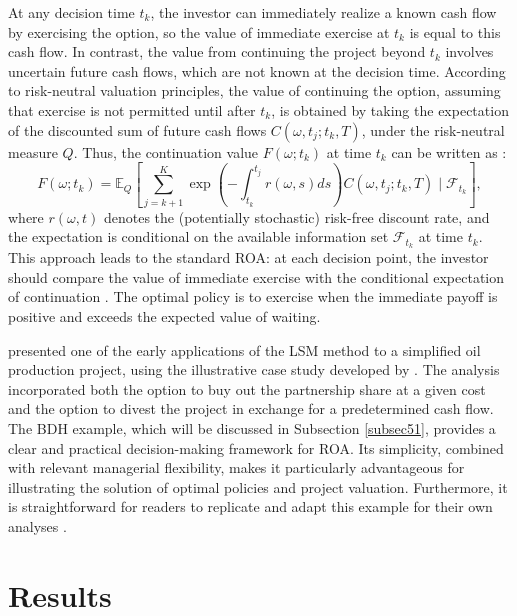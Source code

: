 \documentclass[pdflatex,sn-basic]{sn-jnl}%
\theoremstyle{thmstyleone}%
\theoremstyle{thmstyletwo}%
\theoremstyle{thmstylethree}%
\begin{document}
At any decision time $t_k$, the investor can immediately realize a known cash flow by exercising the option, so the value of immediate exercise at $t_k$ is equal to this cash flow. In contrast, the value from continuing the project beyond $t_k$ involves uncertain future cash flows, which are not known at the decision time. According to risk-neutral valuation principles, the value of continuing the option, assuming that exercise is not permitted until after $t_k$, is obtained by taking the expectation of the discounted sum of future cash flows $C(\omega, t_j; t_k, T)$, under the risk-neutral measure $Q$. Thus, the continuation value $F(\omega; t_k)$ at time $t_k$ can be written as \citep{ref14}:
\begin{equation}
F(\omega; t_k) = \mathbb{E}_Q \left[ \sum_{j=k+1}^K \exp \left( -\int_{t_k}^{t_j} r(\omega, s) ds \right) C(\omega, t_j; t_k, T) \; \bigg| \; \mathcal{F}_{t_k} \right],
\end{equation}
where $r(\omega, t)$ denotes the (potentially stochastic) risk-free discount rate, and the expectation is conditional on the available information set $\mathcal{F}_{t_k}$ at time $t_k$. This approach leads to the standard ROA: at each decision point, the investor should compare the value of immediate exercise with the conditional expectation of continuation \citep{ref14}. The optimal policy is to exercise when the immediate payoff is positive and exceeds the expected value of waiting.


\cite{ref13} presented one of the early applications of the LSM method to a simplified oil production project, using the illustrative case study developed by \cite{ref12a, ref12b}. The analysis incorporated both the option to buy out the partnership share at a given cost and the option to divest the project in exchange for a predetermined cash flow. The BDH example, which will be discussed in Subsection \ref{subsec51}, provides a clear and practical decision-making framework for ROA. Its simplicity, combined with relevant managerial flexibility, makes it particularly advantageous for illustrating the solution of optimal policies and project valuation. Furthermore, it is straightforward for readers to replicate and adapt this example for their own analyses \citep{ref15}.







\section{Results}\label{sec5}
\end{document}
